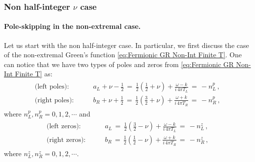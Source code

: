 \documentclass[11pt,a4paper]{article}
\begin{document}
\subsubsection{Non half-integer $\nu$ case} \label{subsec:Non half-integer nu case Fermi}

\paragraph{Pole-skipping in the non-extremal case.}
Let us start with the non half-integer case.
In particular, we first discuss the case of the non-extremal Green's function \eqref{eq:Fermionic GR Non-Int Finite T}.
One can notice that we have two types of poles and zeros from \eqref{eq:Fermionic GR Non-Int Finite T} as:
\begin{align}\label{FPF1}
\begin{split}
    \text{(left poles):} \qquad & {a}_L+\nu-\frac{1}{2} \,=\, \frac{1}{2}\left( \frac{1}{2} + \nu \right) + \frac{\omega-k}{i\,4 \pi T_L} \,=\, - n^p_L\,,\\
    \text{(right poles):} \qquad & {b}_R+\nu+\frac{1}{2} \,=\, \frac{1}{2}\left( \frac{3}{2} +\nu \right) + \frac{\omega+k}{i\, 4 \pi T_R} \,=\, - n^p_R\,,
\end{split}
\end{align}
where $n^p_L,n^p_R=0,1,2,\cdots$ and
\begin{align}\label{FPF2}
\begin{split}
    \text{(left zeros):} \qquad & {a}_L \,=\, \frac{1}{2}\left( \frac{3}{2} - \nu \right)  + \frac{\omega-k}{i\, 4 \pi T_L} \,=\, - n^z_L\,,\\
    \text{(right zeros):} \qquad & {b}_R \,=\, \frac{1}{2}\left(\frac{1}{2} - \nu \right) + \frac{\omega+k}{i\, 4 \pi T_R} \,=\, - n^z_R\,,
\end{split}
\end{align}
where $n^z_L,n^z_R=0,1,2,\cdots$. 
\end{document}
